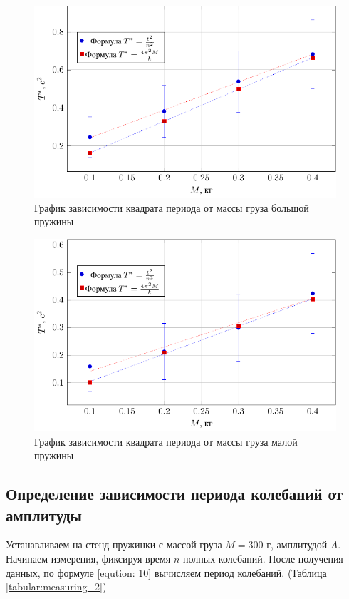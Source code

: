 \vfill

\begin{figure}[htbp]
	\includegraphics[scale=1.5]{img/graph_3}
	\caption{График зависимости квадрата периода от массы груза большой пружины}
	\label{fig:ris3}
\end{figure}
\begin{figure}[htbp]
	\includegraphics[scale=1.5]{img/graph_4}
	\caption{График зависимости квадрата периода от массы груза малой пружины}
	\label{fig:ris4}
\end{figure}

\newpage
\subsection{Определение зависимости периода колебаний от амплитуды}
Устанавливаем на стенд пружинки с массой груза $M = 300$ г, амплитудой $A$. Начинаем измерения, фиксируя время $n$ полных колебаний. После получения данных, по формуле \ref{eqution: 10} вычисляем период колебаний. (Таблица \ref{tabular:measuring_2})

